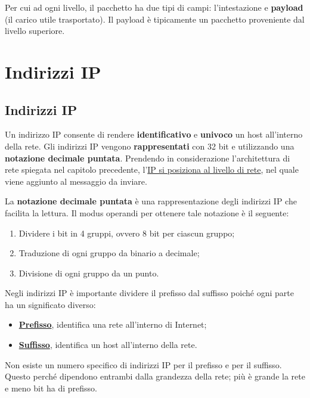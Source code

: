 \documentclass[a4paper]{article}
\begin{document}
	\noindent
	Per cui ad ogni livello, il pacchetto ha due tipi di campi: l’intestazione e \textbf{payload} (il carico utile trasportato). Il payload è tipicamente un pacchetto proveniente dal livello superiore.
	
	\section{Indirizzi IP}
	
	\subsection{Indirizzi IP}
	
	Un indirizzo IP consente di rendere \textbf{identificativo} e \textbf{univoco} un host all'interno della rete. Gli indirizzi IP vengono \textbf{rappresentati} con 32 bit e utilizzando una \textbf{notazione decimale puntata}. Prendendo in considerazione l’architettura di rete spiegata nel capitolo precedente, l’\underline{IP si posiziona al livello di rete}, nel quale viene aggiunto al messaggio da inviare.\newline
	
	\noindent
	La \textcolor{Red3}{\textbf{notazione decimale puntata}} è una rappresentazione degli indirizzi IP che facilita la lettura. Il modus operandi per ottenere tale notazione è il seguente:
	
	\begin{enumerate}
		\item Dividere i bit in 4 gruppi, ovvero 8 bit per ciascun gruppo;
		
		\item Traduzione di ogni gruppo da binario a decimale;
		
		\item Divisione di ogni gruppo da un punto.
	\end{enumerate}

	\noindent
	Negli indirizzi IP è importante dividere il prefisso dal suffisso poiché ogni parte ha un significato diverso:
	
	\begin{itemize}
		\item \textbf{\underline{Prefisso}}, identifica una rete all'interno di Internet;
		\item \textbf{\underline{Suffisso}}, identifica un host all'interno della rete.
	\end{itemize}
	
	\noindent
	Non esiste un numero specifico di indirizzi IP per il prefisso e per il suffisso. Questo perché dipendono entrambi dalla grandezza della rete; più è grande la rete e meno bit ha di prefisso.\newline
	
\end{document}
